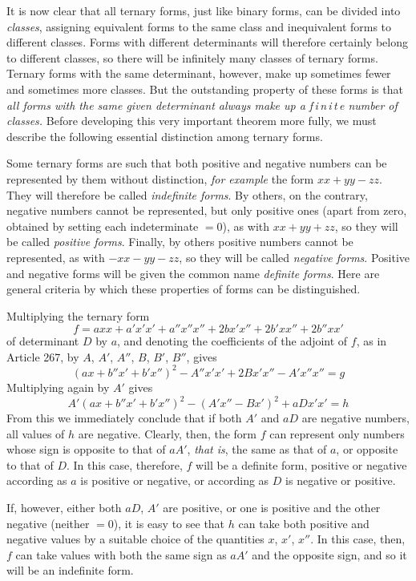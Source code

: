 It is now clear that all ternary forms, just like binary forms, can be divided into \textit{classes}, assigning equivalent forms to the same class and inequivalent forms to different classes. Forms with different determinants will therefore certainly belong to different classes, so there will be infinitely many classes of ternary forms. Ternary forms with the same determinant, however, make up sometimes fewer and sometimes more classes. But the outstanding property of these forms is that \textit{all forms with the same given determinant always make up a f\,i\,n\,i\,t\,e number of classes.} Before developing this very important theorem more fully, we must describe the following essential distinction among ternary forms.

Some ternary forms are such that both positive and negative numbers can be represented by them without distinction, \textit{for example} the form $xx+yy-zz$. They will therefore be called \textit{indefinite forms}. By others, on the contrary, negative numbers cannot be represented, but only positive ones (apart from zero, obtained by setting each indeterminate $=0$), as with $xx+yy+zz$, so they will be called \textit{positive forms}. Finally, by others positive numbers cannot be represented, as with $-xx-yy-zz$, so they will be called \textit{negative forms}. Positive and negative forms will be given the common name \textit{definite forms}. Here are general criteria by which these properties of forms can be distinguished.

Multiplying the ternary form
\[
f=axx+a'x'x'+a''x''x''+2bx'x''+2b'xx''+2b''xx'
\]
of determinant $D$ by $a$, and denoting the coefficients of the adjoint of $f$, as in Article 267, by $A$, $A'$, $A''$, $B$, $B'$, $B''$, gives
\[
(ax+b''x'+b'x'')^2-A''x'x'+2Bx'x''-A'x''x''=g
\]
Multiplying again by $A'$ gives
\[
A'(ax+b''x'+b'x'')^2-(A'x''-Bx')^2+aDx'x'=h
\]
From this we immediately conclude that if both $A'$ and $aD$ are negative numbers, all values of $h$ are negative. Clearly, then, the form $f$ can represent only numbers whose sign is opposite to that of $aA'$, \textit{that is}, the same as that of $a$, or opposite to that of $D$. In this case, therefore, $f$ will be a definite form, positive or negative according as $a$ is positive or negative, or according as $D$ is negative or positive.

If, however, either both $aD$, $A'$ are positive, or one is positive and the other negative (neither $=0$), it is easy to see that $h$ can take both positive and negative values by a suitable choice of the quantities $x$, $x'$, $x''$. In this case, then, $f$ can take values with both the same sign as $aA'$ and the opposite sign, and so it will be an indefinite form.

